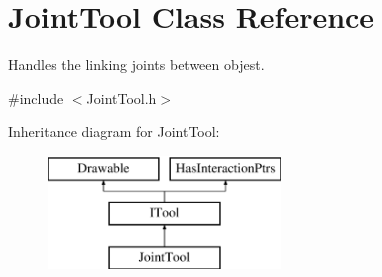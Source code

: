 \hypertarget{class_joint_tool}{}\section{Joint\+Tool Class Reference}
\label{class_joint_tool}


Handles the linking joints between objest.  




{\ttfamily \#include $<$Joint\+Tool.\+h$>$}

Inheritance diagram for Joint\+Tool\+:\begin{figure}[H]
\begin{center}
\leavevmode
\includegraphics[height=3.000000cm]{class_joint_tool}
\end{center}
\end{figure}

